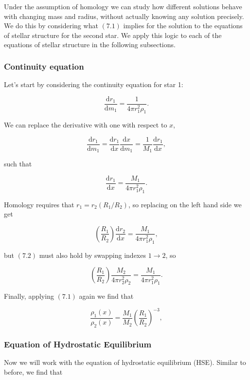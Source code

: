 \documentclass[twocolumn]{article}
\begin{document}
Under the assumption of homology we can study how different solutions
behave with changing mass and radius, without actually knowing any
solution precisely. We do this by considering what \((7.1)\) implies for
the solution to the equations of stellar structure for the second star.
We apply this logic to each of the equations of stellar structure in the
following subsections.

\hypertarget{continuity-equation-1}{%
\subsubsection{Continuity equation}\label{continuity-equation-1}}

Let's start by considering the continuity equation for star 1:

\[\frac{\mathrm{d}r_1}{\mathrm{d}m_1}=\frac{1}{4\pi r_1^2 \rho_1}.\]

We can replace the derivative with one with respect to \(x\),

\[\frac{\mathrm{d}r_1}{\mathrm{d}m_1}=\frac{\mathrm{d}r_1}{\mathrm{d}x}\frac{\mathrm{d}x}{\mathrm{d}m_1}=\frac{1}{M_1}\frac{\mathrm{d} r_1}{\mathrm{d}x},\]

such that

\[\frac{\mathrm{d}r_1}{\mathrm{d}x}=\frac{M_1}{4\pi r_1^2 \rho_1}.\tag{7.2}\]

Homology requires that \(r_1=r_2(R_1/R_2)\), so replacing on the left
hand side we get

\[\left(\frac{R_1}{R_2}\right)\frac{\mathrm{d}r_2}{\mathrm{d}x}=\frac{M_1}{4\pi r_1^2\rho_1},\]

but \((7.2)\) must also hold by swapping indexes \(1\rightarrow 2\), so

\[\left(\frac{R_1}{R_2}\right)\frac{M_2}{4\pi r_2^2 \rho_2}=\frac{M_1}{4\pi r_1^2 \rho_1}.\]

Finally, applying \((7.1)\) again we find that

\[\boxed{\frac{\rho_1(x)}{\rho_2(x)}=\frac{M_1}{M_2}\left(\frac{R_1}{R_2}\right)^{-3}},\tag{7.3}\]

\hypertarget{equation-of-hydrostatic-equilibrium}{%
\subsubsection{Equation of Hydrostatic
Equilibrium}\label{equation-of-hydrostatic-equilibrium}}

Now we will work with the equation of hydrostatic equilibrium (HSE).
Similar to before, we find that
\end{document}
